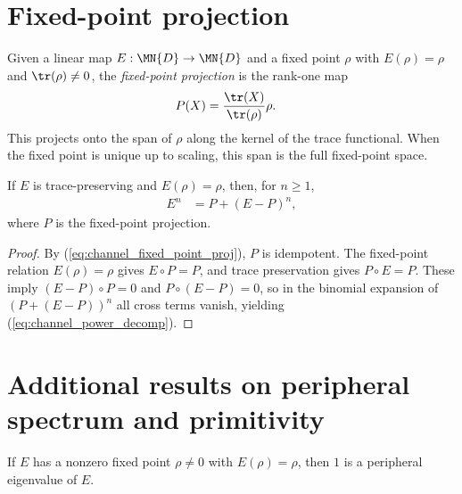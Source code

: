 \section{Fixed-point projection}

\begin{definition}\label{def:fixed_point_proj}
    \leanok
    Given a linear map $E:\MN{D}\to\MN{D}$ and a fixed point
    $\rho$ with $E(\rho)=\rho$ and $\tr(\rho)\neq0$,
    the \emph{fixed-point projection} is the rank-one map
    \begin{align}
        P(X)
         & =\frac{\tr(X)}{\tr(\rho)}\rho.
        \label{eq:channel_fixed_point_proj}
    \end{align}
    This projects onto the span of $\rho$ along the kernel of the
    trace functional. When the fixed point is unique up to scaling,
    this span is the full fixed-point space.
\end{definition}

\begin{theorem}\label{thm:pow_decomp}
    \leanok
    If $E$ is trace-preserving and $E(\rho)=\rho$, then, for $n\geq1$,
    \begin{align}
        E^n
         & =P+(E-P)^n,
        \label{eq:channel_power_decomp}
    \end{align}
    where $P$ is the fixed-point projection.
\end{theorem}

\begin{proof}
    \leanok
    By (\ref{eq:channel_fixed_point_proj}), $P$ is idempotent.
    The fixed-point relation $E(\rho)=\rho$ gives $E\circ P=P$, and trace
    preservation gives $P\circ E=P$. These imply
    $(E-P)\circ P=0$ and $P\circ(E-P)=0$, so in the binomial expansion of
    $(P+(E-P))^n$ all cross terms vanish, yielding
    (\ref{eq:channel_power_decomp}).
\end{proof}

\section{Additional results on peripheral spectrum and primitivity}

\begin{theorem}\label{thm:one_peripheral}
    \leanok
    If $E$ has a nonzero fixed point $\rho\neq0$ with $E(\rho)=\rho$,
    then $1$ is a peripheral eigenvalue of $E$.
\end{theorem}

